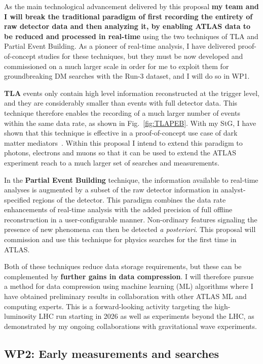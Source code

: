 \documentclass[11pt,a4paper]{article}
\begin{document}
As the main technological advancement delivered by this proposal \textbf{my team and I will break the traditional paradigm of first recording the entirety of raw detector data and then analyzing it, by enabling ATLAS data to be reduced and processed in real-time} using the two techniques of TLA and Partial Event Building. As a pioneer of real-time analysis, I have delivered proof-of-concept studies for these techniques, but they must be now developed and commissioned on a much larger scale in order for me to exploit them for groundbreaking DM searches with the Run-3 dataset, and I will do so in WP1. 

\textbf{TLA} events only contain high level information reconstructed at the trigger level, and they are considerably smaller than events with full detector data. 
This technique therefore enables the recording of a much larger number of events within the same data rate, as shown in Fig.~\ref{fig:TLAPEB}.  
With my StG, I have shown that this technique is effective in a proof-of-concept use case of dark matter mediators~\cite{PRL_TLA}. 
Within this proposal I intend to extend this paradigm to photons, electrons and muons so that it can be used to extend the ATLAS experiment reach to a much larger set of searches and measurements. 

In the \textbf{Partial Event Building} technique, the information available to real-time analyses is augmented by a subset of the raw detector information in analyst-specified regions of the detector. This paradigm combines the data rate enhancements of real-time analysis with the added precision of full offline reconstruction in a user-configurable manner. 
Non-ordinary features signaling the presence of new phenomena can then be detected \textit{a posteriori}. 
This proposal will commission and use this technique for physics searches for the first time in ATLAS. 

Both of these techniques reduce data storage requirements, but these can be complemented by \textbf{further gains in data compression}. I will therefore pursue a method for data compression using machine learning (ML) algorithms where I have obtained preliminary results in collaboration with other ATLAS ML and computing experts. This is a forward-looking activity targeting the high-luminosity LHC run starting in 2026 as well as experiments beyond the LHC, as demonstrated by my ongoing collaborations with gravitational wave experiments.

\subsection*{WP2: Early measurements and searches}
\end{document}
